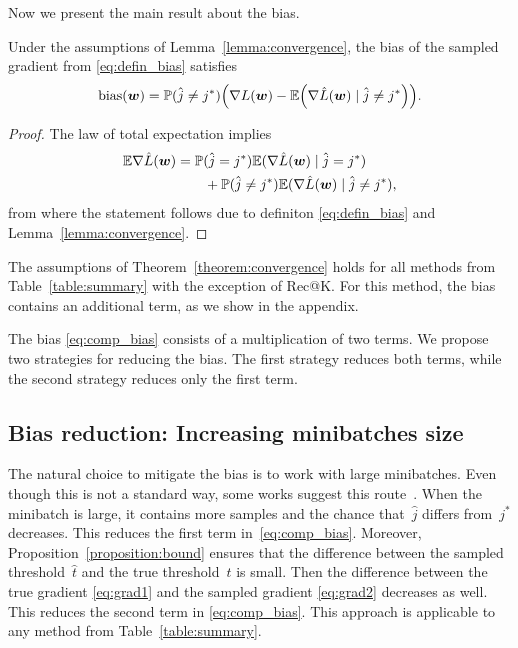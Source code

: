 Now we present the main result about the bias.

\begin{theorem}\label{theorem:convergence}
  Under the assumptions of Lemma~\ref{lemma:convergence}, the bias of the sampled gradient from \eqref{eq:defin_bias} satisfies
  \begin{equation}\label{eq:comp_bias}
    \bias(\bm{w}) = \PP(\hat j\neq j^*) \Brac{\nabla L(\bm{w}) - \EE\Brac{\nabla \hat L(\bm{w}) \mid \hat j\neq j^*}}.
  \end{equation}
\end{theorem}
\begin{proof}
  The law of total expectation implies
  \begin{equation*}
    \begin{aligned}
      \mathbb{E} \nabla \hat L(\bm{w})
      & = \mathbb{P}(\hat j=j^*)\mathbb{E}(\nabla \hat L(\bm{w}) \mid \hat j=j^*) \\
      & \qquad + \mathbb{P}(\hat j\neq j^*)\mathbb{E}(\nabla \hat L(\bm{w}) \mid \hat j\neq j^*),
    \end{aligned}
  \end{equation*}
  from where the statement follows due to definiton \eqref{eq:defin_bias} and Lemma~\ref{lemma:convergence}.
\end{proof}

The assumptions of Theorem~\ref{theorem:convergence} holds for all methods from Table~\ref{table:summary} with the exception of Rec@K. For this method, the bias contains an additional term, as we show in the appendix.

The bias \eqref{eq:comp_bias} consists of a multiplication of two terms. We propose two strategies for reducing the bias. The first strategy reduces both terms, while the second strategy reduces only the first term.

\subsection{Bias reduction: Increasing minibatches size}\label{sec:bias1}

The natural choice to mitigate the bias is to work with large minibatches. Even though this is not a standard way, some works suggest this route~\cite{you2019large}. When the minibatch is large, it contains more samples and the chance that~$\hat j$ differs from~$j^*$ decreases. This reduces the first term in~\eqref{eq:comp_bias}. Moreover, Proposition~\ref{proposition:bound} ensures that the difference between the sampled threshold~$\hat t$ and the true threshold~$t$ is small. Then the difference between the true gradient \eqref{eq:grad1} and the sampled gradient \eqref{eq:grad2} decreases as well. This reduces the second term in \eqref{eq:comp_bias}. This approach is applicable to any method from Table~\ref{table:summary}.

